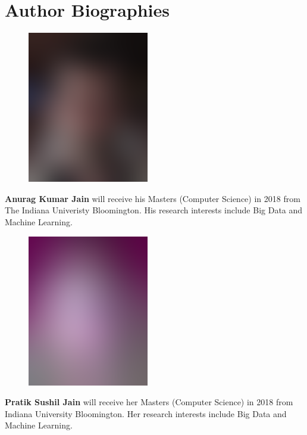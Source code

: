 \documentclass[9pt,twocolumn,twoside]{../../styles/osajnl}
\begin{document}
\section*{Author Biographies}
	\begingroup \setlength\intextsep{0pt}
	\begin{minipage}[t][3.2cm][t]{1.0\columnwidth}
	  \begin{figure}
	    \includegraphics[width=0.25\columnwidth]{images/john_smith.eps}
	  \end{figure}
	  \noindent
	  {\bfseries Anurag Kumar Jain} will receive his Masters (Computer Science)
	  in 2018 from The Indiana Univeristy Bloomington. His research
	  interests include Big Data and Machine Learning.
	\end{minipage}
	\begin{minipage}[t][3.2cm][t]{1.0\columnwidth} %
	  \begin{figure}
	    \includegraphics[width=0.25\columnwidth]{images/alice_smith.eps}
	  \end{figure}
	  \noindent
	  {\bfseries Pratik Sushil Jain} will receive her Masters (Computer
	  Science) in 2018 from Indiana University Bloomington. Her research
	  interests include Big Data and Machine Learning.
	\end{minipage}
\end{document}

